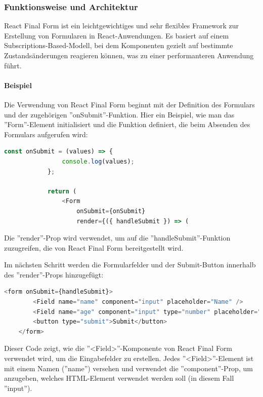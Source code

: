         \subsubsection{Funktionsweise und Architektur} 
        React Final Form\cite{reactfinalform} ist ein leichtgewichtiges und sehr flexibles Framework zur Erstellung von Formularen in React-Anwendungen. Es basiert auf einem Subscriptions-Based-Modell, bei dem Komponenten gezielt auf bestimmte Zustandsänderungen reagieren können, was zu einer performanteren Anwendung führt.
    
            \paragraph{Beispiel}
            Die Verwendung von React Final Form beginnt mit der Definition des Formulars und der zugehörigen ''onSubmit''-Funktion. Hier ein Beispiel, wie man das ''Form''-Element initialisiert und die Funktion definiert, die beim Absenden des Formulars aufgerufen wird:
            
            \begin{lstlisting}[language=JavaScript]
            const onSubmit = (values) => {  
                console.log(values); 
            };
            
            return (
                <Form
                    onSubmit={onSubmit}  
                    render={({ handleSubmit }) => (  
            \end{lstlisting}
            
             Die ''render''-Prop wird verwendet, um auf die ''handleSubmit''-Funktion zuzugreifen, die von React Final Form bereitgestellt wird.
            
            Im nächsten Schritt werden die Formularfelder und der Submit-Button innerhalb des ''render''-Props hinzugefügt:
            
            \begin{lstlisting}[language=JavaScript]
    <form onSubmit={handleSubmit}> 
        <Field name="name" component="input" placeholder="Name" />  
        <Field name="age" component="input" type="number" placeholder="Age" />  
        <button type="submit">Submit</button>  
    </form>
            \end{lstlisting}
            
            Dieser Code zeigt, wie die ''<Field>''-Komponente von React Final Form verwendet wird, um die Eingabefelder zu erstellen. Jedes ''<Field>''-Element ist mit einem Namen (''name'') versehen und verwendet die ''component''-Prop, um anzugeben, welches HTML-Element verwendet werden soll (in diesem Fall ''input'').
    
